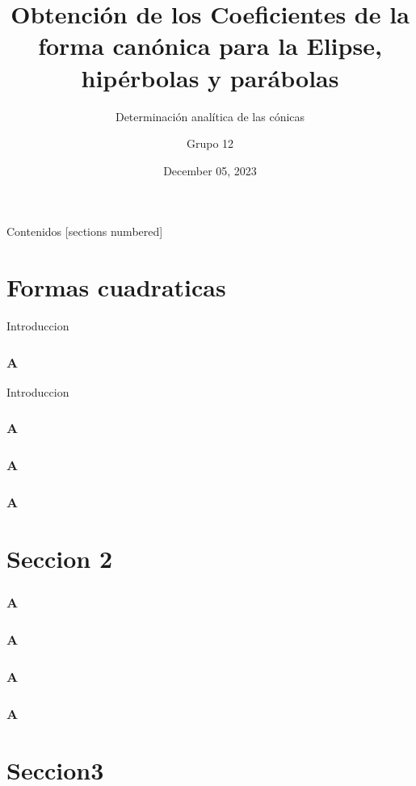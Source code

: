 \documentclass[xcolor={dvipsnames},aspectratio=169,10pt]{beamer}
\title{Obtención de los Coeficientes de la forma canónica para la Elipse, hipérbolas y parábolas}
\subtitle{Determinación analítica de las cónicas}
\author{Grupo 12}
\date{December 05, 2023}
\begin{document}
\maketitle%

\begin{frame}{Contenidos}
  [sections numbered]
  \tableofcontents[hideallsubsections]
\end{frame}

\section{Formas cuadraticas}

\begin{frame}{Introduccion}
    \frametitle{A}
    \lipsum[1-1]
\end{frame}

\begin{frame}[fragile]{Introduccion}
    \frametitle{A}
    \lipsum[1-1]
\end{frame}

\begin{frame}{2}
    \frametitle{A}
    \lipsum[1-1]
\end{frame}

\begin{frame}{3}
    \frametitle{A}
    \lipsum[1-1]
\end{frame}

\section{Seccion 2}

\begin{frame}[fragile]{2.1}
    \frametitle{A}
    \lipsum[1-1]
\end{frame}

\begin{frame}[fragile]{2.2}
    \frametitle{A}
    \lipsum[1-1]
\end{frame}


\begin{frame}[fragile]{2.3}
    \frametitle{A}
    \lipsum[1-1]
\end{frame}

\begin{frame}[fragile]{2.4}
    \frametitle{A}
    \lipsum[1-1]
\end{frame}

\section{Seccion3}
\end{document}
